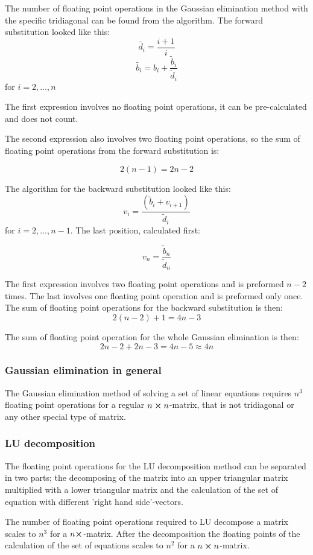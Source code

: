 The number of floating point operations in the Gaussian elimination method with the specific tridiagonal can be found from the algorithm. The forward substitution looked like this:
\[
\tilde{d_i} = \frac{i+1}{i}
\]
\[
\tilde{b_i} = b_i + \frac{\tilde{b}_i}{\tilde{d}_i} 
\]
for $i = 2, \dots, n $

The first expression involves no floating point operations, it can be pre-calculated and does not count.

The second expression also involves two floating point operations, so the sum of floating point operations from the forward substitution is:

\[
2(n-1) = 2n-2
\]

The algorithm for the backward substitution looked like this:
\[
v_i = \frac{\left(\tilde{b}_i +v_{i+1}\right)}{\tilde{d}_i}
\]
for $i = 2, \dots, n-1 $. The last position, calculated first:

\[
v_{n} = \frac{\tilde{b}_{n}}{\tilde{d}_{n}}
\]

The first expression involves two floating point operations and is preformed $n-2$ times. The last involves one floating point operation and is preformed only once. The sum of floating point operations for the backward substitution is then:
\[
2(n-2) + 1 = 4n - 3
\]

The sum of floating point operation for the whole Gaussian elimination is then:
\[
2n - 2 + 2n - 3 = 4n - 5 \approx 4n
\]

\subsubsection{Gaussian elimination in general}

The Gaussian elimination method of solving a set of linear equations requires $n^3$ floating point operations for a regular $n \cross n$-matrix, that is not tridiagonal or any other special type of matrix. 

\subsubsection{LU decomposition}

The floating point operations for the LU decomposition method can be separated in two parts; the decomposing of the matrix into an upper triangular matrix multiplied with a lower triangular matrix and the calculation of the set of equation with different 'right hand side'-vectors.

The number of floating point operations required to LU decompose a matrix scales to $n^3$ for a $n \cross$-matrix. After the decomposition the floating points of the calculation of the set of equations scales to $n^2$ for a $n \cross n$-matrix.

